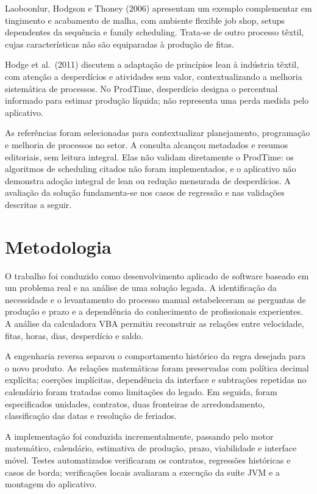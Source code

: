 \documentclass[12pt]{article}
\begin{document}
Laoboonlur, Hodgson e Thoney (2006) apresentam um exemplo complementar em tingimento e acabamento de malha, com ambiente flexible job shop, setups dependentes da sequência e family scheduling. Trata-se de outro processo têxtil, cujas características não são equiparadas à produção de fitas.

Hodge et al.~(2011) discutem a adaptação de princípios lean à indústria têxtil, com atenção a desperdícios e atividades sem valor, contextualizando a melhoria sistemática de processos. No ProdTime, desperdício designa o percentual informado para estimar produção líquida; não representa uma perda medida pelo aplicativo.

As referências foram selecionadas para contextualizar planejamento, programação e melhoria de processos no setor. A consulta alcançou metadados e resumos editoriais, sem leitura integral. Elas não validam diretamente o ProdTime: os algoritmos de scheduling citados não foram implementados, e o aplicativo não demonstra adoção integral de lean ou redução mensurada de desperdícios. A avaliação da solução fundamenta-se nos casos de regressão e nas validações descritas a seguir.

\section{Metodologia}\label{metodologia}

O trabalho foi conduzido como desenvolvimento aplicado de software baseado em um problema real e na análise de uma solução legada. A identificação da necessidade e o levantamento do processo manual estabeleceram as perguntas de produção e prazo e a dependência do conhecimento de profissionais experientes. A análise da calculadora VBA permitiu reconstruir as relações entre velocidade, fitas, horas, dias, desperdício e saldo.

A engenharia reversa separou o comportamento histórico da regra desejada para o novo produto. As relações matemáticas foram preservadas com política decimal explícita; coerções implícitas, dependência da interface e subtrações repetidas no calendário foram tratadas como limitações do legado. Em seguida, foram especificados unidades, contratos, duas fronteiras de arredondamento, classificação das datas e resolução de feriados.

A implementação foi conduzida incrementalmente, passando pelo motor matemático, calendário, estimativa de produção, prazo, viabilidade e interface móvel. Testes automatizados verificaram os contratos, regressões históricas e casos de borda; verificações locais avaliaram a execução da suíte JVM e a montagem do aplicativo.
\end{document}
